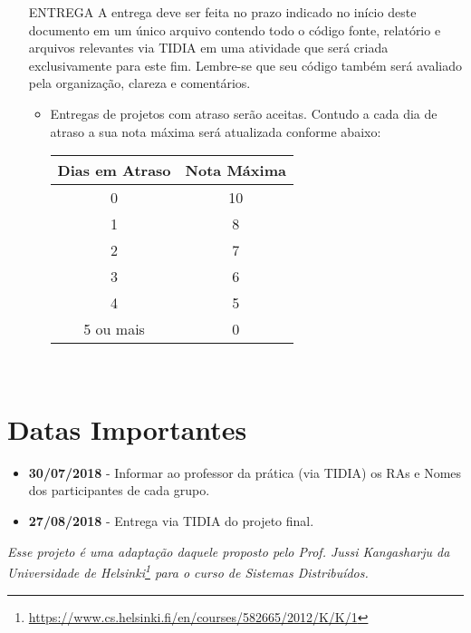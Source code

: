 \documentclass[oneside,12pt,a4paper]{article}
\begin{document}
\begin{enumerate}
\item[ENTREGA] A entrega deve ser feita no prazo indicado no
  início deste documento em um único arquivo contendo todo o código
  fonte, relatório e arquivos relevantes via TIDIA em uma atividade
  que será criada exclusivamente para este fim. Lembre-se que seu
  código também será avaliado pela organização, clareza e comentários.

  \begin{itemize}
  \item Entregas de projetos com atraso serão aceitas. Contudo a cada
    dia de atraso a sua nota máxima será atualizada conforme abaixo:
    \begin{table}[h]
      \centering
      \begin{tabular}{|c|c|}
        \hline
        \textbf{Dias em Atraso} & \textbf{Nota Máxima} \\ \hline
        0                       & 10                   \\ \hline
        1                       & 8                    \\ \hline
        2                       & 7                    \\ \hline
        3                       & 6                    \\ \hline
        4                       & 5                    \\ \hline
        5 ou mais               & 0                    \\ \hline
      \end{tabular}
    \end{table}
  \end{itemize}


\end{enumerate}
\
\section{Datas Importantes}
\begin{itemize}
\item \textbf{30/07/2018} - Informar ao professor da prática (via TIDIA) os
  RAs e Nomes dos participantes de cada grupo.
\item \textbf{27/08/2018} - Entrega via TIDIA do projeto final.
\end{itemize}

\vfill \emph{Esse projeto é uma adaptação daquele proposto pelo
  Prof. Jussi Kangasharju da Universidade de
  Helsinki\footnote{\url{https://www.cs.helsinki.fi/en/courses/582665/2012/K/K/1}}
  para o curso de Sistemas Distribuídos.}
\end{document}
